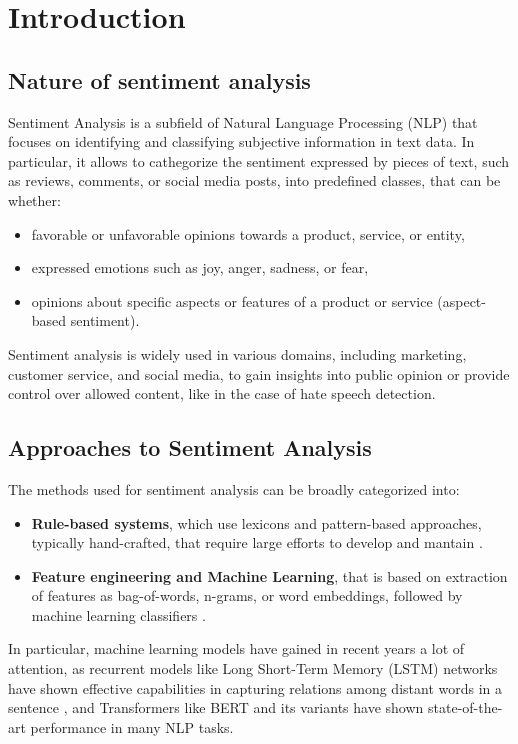 \section{Introduction}
\label{sec:introduction}
    \subsection{Nature of sentiment analysis}
    \label{subsec:nature_of_sentiment_analysis}
        Sentiment Analysis is a subfield of Natural Language Processing (NLP) that focuses on identifying
        and classifying subjective information in text data. In particular, it allows to cathegorize the
        sentiment expressed by pieces of text, such as reviews, comments, or social media posts, into 
        predefined classes, that can be whether:
        \begin{itemize}
            \item favorable or unfavorable opinions towards a product, service, or entity,
            \item expressed emotions such as joy, anger, sadness, or fear,
            \item opinions about specific aspects or features of a product or service (aspect-based sentiment).
        \end{itemize}
        Sentiment analysis is widely used in various domains, including marketing, customer service, 
        and social media, to gain insights into public opinion or provide control over allowed content,
        like in the case of hate speech detection.

    \subsection{Approaches to Sentiment Analysis}
    \label{subsec:approaches_to_sentiment_analysis}
        The methods used for sentiment analysis can be broadly categorized into: 
        \begin{itemize}
            \item \textbf{Rule-based systems}, which use lexicons and pattern-based approaches, typically hand-crafted,
                    that require large efforts to develop and mantain \citep{gupta2024comprehensivestudysentimentanalysis}.
            \item \textbf{Feature engineering and Machine Learning}, that is based on extraction of features as
                    bag-of-words, n-grams, or word embeddings, followed by machine learning classifiers \citep{gupta2024comprehensivestudysentimentanalysis}.
        \end{itemize}
        In particular, machine learning models have gained in recent years a lot of attention, as recurrent models
        like Long Short-Term Memory (LSTM) networks have shown effective capabilities in capturing relations among
        distant words in a sentence \citep{staudemeyer2019understandinglstmtutorial}, and Transformers like
        BERT \citep{devlin2019bert} and its variants have shown state-of-the-art performance in many NLP tasks.

